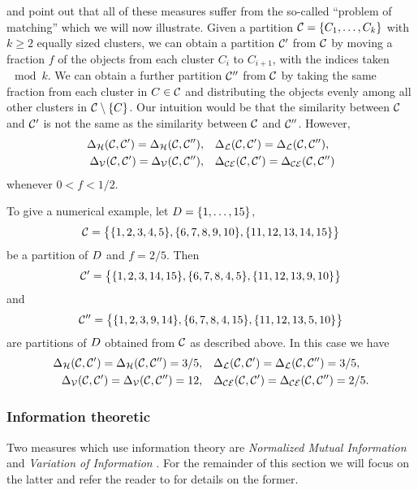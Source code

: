 \citet{meila-2007} and \citet{bae2010comparison} point out that all of these
measures suffer from the so-called ``problem of matching'' which we will now
illustrate.  Given a partition $\mathcal{C}=\{C_1,\dotsc,C_k\}$ with $k\geq 2$
equally sized clusters, we can obtain a partition $\mathcal{C}'$ from $\mathcal{C}$ by
moving a fraction $f$ of the objects from each cluster $C_{i}$ to $C_{i+1}$,
with the indices taken$\mod k$.  We can obtain a further partition $\mathcal{C}''$
from $\mathcal{C}$ by taking the same fraction from each cluster in $C \in \mathcal{C}$
and distributing the objects evenly among all other clusters in $\mathcal{C}
\setminus \{C\}$.  Our intuition would be that the similarity between $\mathcal{C}$
and $\mathcal{C}'$ is not the same as the similarity between $\mathcal{C}$ and $\mathcal{C}''$.
However,
\begin{align*}
  \Delta_{\mathcal{H}}(\mathcal{C},\mathcal{C}') = \Delta_{\mathcal{H}}(\mathcal{C},\mathcal{C}''),&\quad
  \Delta_{\mathcal{L}}(\mathcal{C},\mathcal{C}') = \Delta_{\mathcal{L}}(\mathcal{C},\mathcal{C}''),\\
  \Delta_{\mathcal{V}}(\mathcal{C},\mathcal{C}') = \Delta_{\mathcal{V}}(\mathcal{C},\mathcal{C}''),&\quad
  \Delta_{\mathcal{CE}}(\mathcal{C},\mathcal{C}') = \Delta_{\mathcal{CE}}(\mathcal{C},\mathcal{C}'')
\end{align*}
whenever $0< f < 1/2$.

To give a numerical example, let $D = \{1,\dotsc,15\}$,
\begin{equation*}
  \mathcal{C} = \big\{\{1,2,3,4,5\},\{6,7,8,9,10\},\{11,12,13,14,15\}\big\}
\end{equation*}
be a partition of $D$ and $f = 2/5$.  Then
\begin{equation*}
\mathcal{C}' = \big\{\{1,2,3,14,15\},\{6,7,8,4,5\},\{11,12,13,9,10\}\big\}
\end{equation*}
and
\begin{equation*}
\mathcal{C}'' = \big\{\{1,2,3,9,14\},\{6,7,8,4,15\},\{11,12,13,5,10\}\big\}
\end{equation*}
are partitions of $D$ obtained from $\mathcal{C}$ as described above.  In this
case we have
\begin{align*}
  \Delta_{\mathcal{H}}(\mathcal{C},\mathcal{C}') = \Delta_{\mathcal{H}}(\mathcal{C},\mathcal{C}'') = 3/5,&\quad
  \Delta_{\mathcal{L}}(\mathcal{C},\mathcal{C}') = \Delta_{\mathcal{L}}(\mathcal{C},\mathcal{C}'') = 3/5,\\
  \Delta_{\mathcal{V}}(\mathcal{C},\mathcal{C}') = \Delta_{\mathcal{V}}(\mathcal{C},\mathcal{C}'') = 12,&\quad
  \Delta_{\mathcal{CE}}(\mathcal{C},\mathcal{C}') = \Delta_{\mathcal{CE}}(\mathcal{C},\mathcal{C}'') = 2/5.
\end{align*}

\subsubsection{Information theoretic}
\label{sec:inform-theor}

Two measures which use information theory are \textit{Normalized Mutual
  Information} \citep{fred-jain-2003} and \textit{Variation of Information}
\citep{meila-2007}.  For the remainder of this section we will focus on the
latter and refer the reader to \citep{fred-jain-2003} for details on the
former.

